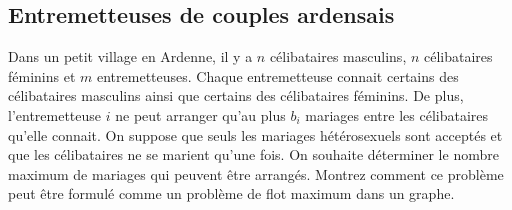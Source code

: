 \subsection{Entremetteuses de couples ardensais}
Dans un petit village en Ardenne, il y a $n$ célibataires masculins, $n$ célibataires féminins et $m$ entremetteuses. Chaque entremetteuse connait certains des célibataires masculins ainsi que certains des célibataires féminins. De plus, l'entremetteuse $i$ ne peut arranger qu'au plus $b_i$ mariages entre les célibataires qu'elle connait. On suppose que seuls les mariages hétérosexuels sont acceptés et que les célibataires ne se marient qu'une fois. On souhaite déterminer le nombre maximum de mariages qui peuvent être arrangés. Montrez comment ce problème peut être formulé comme un problème de flot maximum dans un graphe. 

